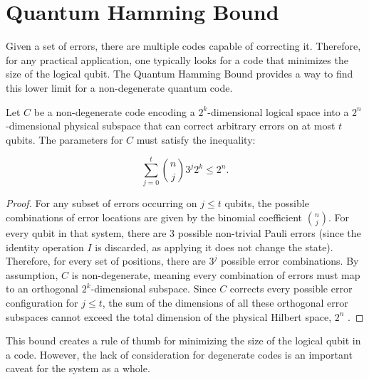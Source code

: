 \section{Quantum Hamming Bound}

Given a set of errors, there are multiple codes capable of correcting it. Therefore, for any practical application, one typically looks for a code that minimizes the size of the logical qubit. The Quantum Hamming Bound provides a way to find this lower limit for a non-degenerate quantum code.

\begin{definition}

Let $C$ be a non-degenerate code encoding a $2^k$-dimensional logical space into a $2^n$-dimensional physical subspace that can correct arbitrary errors on at most $t$ qubits. The parameters for $C$ must satisfy the inequality:

\begin{equation}
  \sum_{j = 0}^t \binom{n}{j} 3^j 2^k \leq 2^n
  \label{eq:quantum_hamming_bound}
.\end{equation}

  \begin{proof}
  For any subset of errors occurring on $j \leq t$ qubits, the possible combinations of error locations are given by the binomial coefficient $\binom{n}{j}$. For every qubit in that system, there are 3 possible non-trivial Pauli errors (since the identity operation $I$ is discarded, as applying it does not change the state). Therefore, for every set of positions, there are $3^j$ possible error combinations. By assumption, $C$ is non-degenerate, meaning every combination of errors must map to an orthogonal $2^k$-dimensional subspace. Since $C$ corrects every possible error configuration for $j \leq t$, the sum of the dimensions of all these orthogonal error subspaces cannot exceed the total dimension of the physical Hilbert space, $2^n$ \citep{Nielsen2010}.
  \end{proof}
\end{definition}

This bound creates a rule of thumb for minimizing the size of the logical qubit in a code. However, the lack of consideration for degenerate codes is an important caveat for the system as a whole. 

